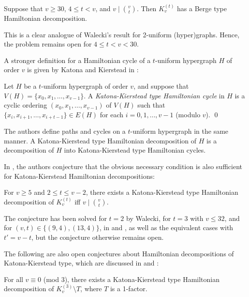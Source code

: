 \begin{theorem} \label{berge-hamilton2}
Suppose that $v \geq 30$, $4 \leq t < v$, and $v \mid {v \choose t}$. Then
$K_v^{(t)}$ has a Berge type Hamiltonian decomposition.
\end{theorem}

This is a clear analogue of Walecki's result for 2-uniform (hyper)graphs.
Hence, the problem remains open for $4 \leq t < v < 30$.

A stronger definition for a Hamiltonian cycle of a $t$-uniform hypergraph $H$ of
order $v$ is given by Katona and Kierstead in \cite{kato-kier}:

\begin{definition}
Let $H$ be a $t$-uniform hypergraph of order $v$, and suppose that $V(H) =
\{x_0, x_1, \ldots, x_{v-1}\}$.
A {\em Katona-Kierstead type Hamiltonian cycle} in $H$ is a cyclic ordering
$(x_0, x_1, \ldots, x_{v-1})$ of $V(H)$
such that $\{x_i, x_{i+1}, \ldots, x_{i+t-1}\} \in E(H)$ for each $i =
0,1,\ldots,v-1$ (modulo $v$).
\qed
\end{definition}

The authors define paths and cycles on a $t$-uniform hypergraph in the same
manner.
A Katona-Kierstead type Hamiltonian decomposition of $H$ is a decomposition of
$H$ into Katona-Kierstead type Hamiltonian cycles.

In \cite{bail-stev}, the authors conjecture that the obvious necessary
condition is also sufficient for Katona-Kierstead Hamiltonian decompositions:

\begin{conjecture} \label{bailey-stevens}
For $v \geq 5$ and $2 \leq t \leq v-2$, there exists a Katona-Kierstead type
Hamiltonian decomposition of $K_{v}^{(t)}$ iff $v \mid {v \choose t}$.
\end{conjecture}

The conjecture has been solved for $t = 2$ by Walecki, for $t=3$ with $v \leq
32$, and for $(v, t) \in \{(9,4),(13,4)\}$, in \cite{bail-stev} and
\cite{mesz-rosa}, as well as the equivalent cases with $t' = v-t$, but
the conjecture otherwise remains open.

The following are also open conjectures about Hamiltonian decompositions of
Katona-Kierstead type, which are discussed in \cite{mesz-rosa} and
\cite{kuhl-schr}:

\begin{conjecture}
For all $v \equiv 0$ (mod $3$), there exists a Katona-Kierstead type
Hamiltonian decomposition of $K_v^{(3)} \setminus T$, where $T$ is a 1-factor.
\end{conjecture}

